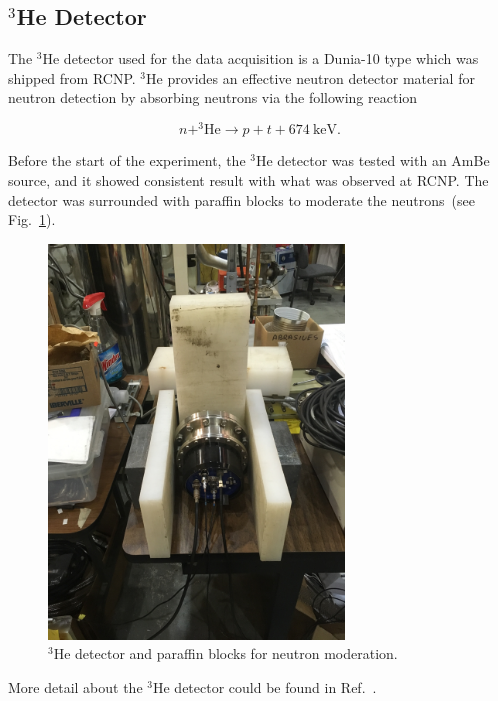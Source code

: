\subsection{$^3$He Detector}

The $^3$He detector used for the data acquisition is a Dunia-10 type
which was shipped from RCNP.  $^3$He provides an effective neutron
detector material for neutron detection by absorbing neutrons via the
following reaction

\begin{equation}
  \label{eqn:he3}
n + ^3\mathrm{He} \rightarrow p + t + 674~\mathrm{keV}.
\end{equation}

Before the start of the experiment, the $^3$He detector was tested
with an AmBe source, and it showed consistent result with what was
observed at RCNP. The detector was surrounded with paraffin blocks to
moderate the neutrons~(see Fig.~\ref{fig:he3detector}).

\begin{figure}[h!]
  \centering
  \includegraphics[width=0.7\textwidth, angle = 270]{he3detector.png}
  \caption{$^3$He detector and paraffin blocks for neutron
    moderation.}
  \label{fig:he3detector}
\end{figure}

More detail about the $^3$He detector could be found in
Ref.~\cite{matsumiya_thesis}.

